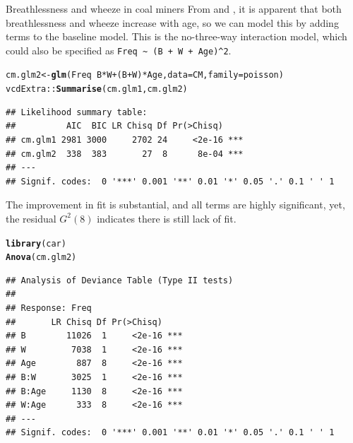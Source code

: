 \documentclass[11pt]{book}\usepackage[]{graphicx}\usepackage[]{color}
\makeatletter
\newcommand{\hlopt}[1]{\textcolor[rgb]{0,0,0}{#1}}%
\newcommand{\hlstd}[1]{\textcolor[rgb]{0.345,0.345,0.345}{#1}}%
\newcommand{\hlkwb}[1]{\textcolor[rgb]{0.69,0.353,0.396}{#1}}%
\newcommand{\hlkwc}[1]{\textcolor[rgb]{0.333,0.667,0.333}{#1}}%
\newcommand{\hlkwd}[1]{\textcolor[rgb]{0.737,0.353,0.396}{\textbf{#1}}}%
\newenvironment{kframe}{%
 \def\at@end@of@kframe{}%
 \ifinner\ifhmode%
  \def\at@end@of@kframe{\end{minipage}}%
  \begin{minipage}{\columnwidth}%
 \fi\fi%
 \def\FrameCommand##1{\hskip\@totalleftmargin \hskip-\fboxsep
 \colorbox{shadecolor}{##1}\hskip-\fboxsep
     \hskip-\linewidth \hskip-\@totalleftmargin \hskip\columnwidth}%
 \MakeFramed {\advance\hsize-\width
   \@totalleftmargin\z@ \linewidth\hsize
   \@setminipage}}%
 {\par\unskip\endMakeFramed%
 \at@end@of@kframe}
\newenvironment{knitrout}{}{} %
\renewenvironment{knitrout}{\small\renewcommand{\baselinestretch}{.85}}{} %
\makeatother
\begin{document}
\begin{Example}[coalminers]{Breathlessness and wheeze in coal miners}
From  and ,
it is apparent that both breathlessness and wheeze increase with age,
so we can model this by adding terms  to the baseline model.
This is the no-three-way interaction model, which could also be specified
as \verb|Freq ~ (B + W + Age)^2|.
\begin{knitrout}
\color{fgcolor}\begin{kframe}
\begin{alltt}
\hlstd{cm.glm2} \hlkwb{<-} \hlkwd{glm}\hlstd{(Freq} \hlopt{~} \hlstd{B} \hlopt{*} \hlstd{W} \hlopt{+} \hlstd{(B} \hlopt{+} \hlstd{W)} \hlopt{*} \hlstd{Age,} \hlkwc{data}\hlstd{=CM,} \hlkwc{family}\hlstd{=poisson)}
\hlstd{vcdExtra::}\hlkwd{Summarise}\hlstd{(cm.glm1, cm.glm2)}
\end{alltt}
\begin{verbatim}
## Likelihood summary table:
##          AIC  BIC LR Chisq Df Pr(>Chisq)    
## cm.glm1 2981 3000     2702 24     <2e-16 ***
## cm.glm2  338  383       27  8      8e-04 ***
## ---
## Signif. codes:  0 '***' 0.001 '**' 0.01 '*' 0.05 '.' 0.1 ' ' 1
\end{verbatim}
\end{kframe}
\end{knitrout}
The improvement in fit is substantial, and all terms are highly significant,
yet, the residual $G^2 (8)$ indicates there is still lack of fit.
\begin{knitrout}
\color{fgcolor}\begin{kframe}
\begin{alltt}
\hlkwd{library}\hlstd{(car)}
\hlkwd{Anova}\hlstd{(cm.glm2)}
\end{alltt}
\begin{verbatim}
## Analysis of Deviance Table (Type II tests)
## 
## Response: Freq
##       LR Chisq Df Pr(>Chisq)    
## B        11026  1     <2e-16 ***
## W         7038  1     <2e-16 ***
## Age        887  8     <2e-16 ***
## B:W       3025  1     <2e-16 ***
## B:Age     1130  8     <2e-16 ***
## W:Age      333  8     <2e-16 ***
## ---
## Signif. codes:  0 '***' 0.001 '**' 0.01 '*' 0.05 '.' 0.1 ' ' 1
\end{verbatim}
\end{kframe}
\end{knitrout}


\end{Example}
\end{document}
